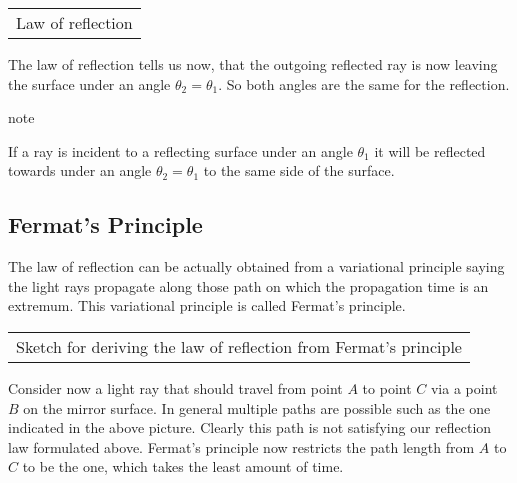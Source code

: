 \documentclass[letterpaper,10pt,english]{sphinxmanual}
\begin{document}
\begin{savenotes}\sphinxattablestart
\centering
\begin{tabulary}{\linewidth}[t]{|T|}
\hline
\sphinxstyletheadfamily 
{} 
\\
\hline
{} Law of reflection
\\
\hline
\end{tabulary}
\par
\sphinxattableend\end{savenotes}

The law of reflection tells us now, that the outgoing reflected ray is now leaving the surface under an angle \(\theta_2=\theta_1\). So both angles are the same for the reflection.

\begin{sphinxadmonition}{note}{}\unskip
{}

If a ray is incident to a reflecting surface under an angle \(\theta_1\) it will be reflected towards under an angle \(\theta_2=\theta_1\) to the same side of the surface.
\end{sphinxadmonition}


\subsection{Fermat’s Principle}
\label{\detokenize{notebooks/L1/Reflection:Fermat_u2019s-Principle}}
The law of reflection can be actually obtained from a variational principle saying the light rays propagate along those path on which the propagation time is an extremum. This variational principle is called Fermat’s principle.


\begin{savenotes}\sphinxattablestart
\centering
\begin{tabulary}{\linewidth}[t]{|T|}
\hline
\sphinxstyletheadfamily 
{}
\\
\hline
{} Sketch for deriving the law of reflection from Fermat’s principle
\\
\hline
\end{tabulary}
\par
\sphinxattableend\end{savenotes}

Consider now a light ray that should travel from point \(A\) to point \(C\) via a point \(B\) on the mirror surface. In general multiple paths are possible such as the one indicated in the above picture. Clearly this path is not satisfying our reflection law formulated above. Fermat’s principle now restricts the path length from \(A\) to \(C\) to be the one, which takes the least amount of time.
\end{document}
